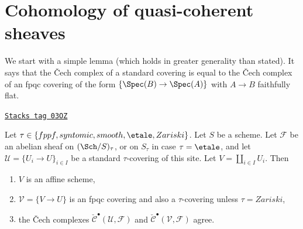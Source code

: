 \section{Cohomology of quasi-coherent sheaves}
\label{etale-cohomology-section-cohomology-quasi-coherent}

We start with a simple lemma (which holds in greater generality than
stated). It says that the {\v C}ech complex of a standard covering is
equal to the {\v C}ech complex of an fpqc covering of the form
$\{\Spec(B) \to \Spec(A)\}$ with $A \to B$ faithfully flat.

\begin{lemma}
\label{etale-cohomology-lemma-cech-complex}
\href{https://stacks.math.columbia.edu/tag/03OZ}{\texttt{Stacks tag 03OZ}}

Let $\tau \in \{fppf, syntomic, smooth, \etale, Zariski\}$.
Let $S$ be a scheme.
Let $\mathcal{F}$ be an abelian sheaf on $(\Sch/S)_\tau$, or on
$S_\tau$ in case $\tau = \etale$, and let
$\mathcal{U} = \{U_i \to U\}_{i \in I}$
be a standard $\tau$-covering of this site.
Let $V = \coprod_{i \in I} U_i$. Then
\begin{enumerate}
\item $V$ is an affine scheme,
\item $\mathcal{V} = \{V \to U\}$ is an fpqc covering
and also a $\tau$-covering unless $\tau = Zariski$,
\item the {\v C}ech complexes
$\check{\mathcal{C}}^\bullet (\mathcal{U}, \mathcal{F})$ and
$\check{\mathcal{C}}^\bullet (\mathcal{V}, \mathcal{F})$ agree.
\end{enumerate}
\end{lemma}

